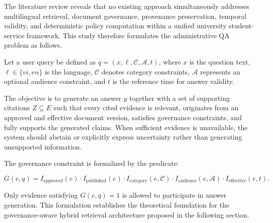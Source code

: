 The literature review reveals that no existing approach simultaneously addresses multilingual retrieval, document governance, provenance preservation, temporal validity, and deterministic policy computation within a unified university student-service framework. This study therefore formulates the administrative QA problem as follows.

Let a user query be defined as
$q=(x,\ell,\mathcal{C},\mathcal{A},t)$,
where $x$ is the question text, $\ell\in\{vi,en\}$ is the language, $\mathcal{C}$ denotes category constraints, $\mathcal{A}$ represents an optional audience constraint, and $t$ is the reference time for answer validity.

The objective is to generate an answer $y$ together with a set of supporting citations $Z\subseteq E$ such that every cited evidence is relevant, originates from an approved and effective document version, satisfies governance constraints, and fully supports the generated claims. When sufficient evidence is unavailable, the system should abstain or explicitly express uncertainty rather than generating unsupported information.

The governance constraint is formalized by the predicate:

\begin{equation}
  G(e,q)
  = I_{\text{approved}}(e)\cdot I_{\text{published}}(e)
    \cdot I_{\text{category}}(e,\mathcal{C})
    \cdot I_{\text{audience}}(e,\mathcal{A})
    \cdot I_{\text{effective}}(e,t).
\label{eq:gov}
\end{equation}

Only evidence satisfying $G(e,q)=1$ is allowed to participate in answer generation. This formulation establishes the theoretical foundation for the governance-aware hybrid retrieval architecture proposed in the following section.